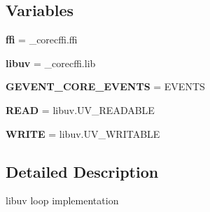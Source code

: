 \subsection*{Variables}
\begin{DoxyCompactItemize}
\item 
\mbox{\label{namespacegevent_1_1libuv_1_1loop_a4fb996f837ab3959057008e3a5cc9d41}} 
{\bfseries ffi} = \+\_\+corecffi.\+ffi
\item 
\mbox{\label{namespacegevent_1_1libuv_1_1loop_a3bfc5dc5535efe991e9957ab52cafa14}} 
{\bfseries libuv} = \+\_\+corecffi.\+lib
\item 
\mbox{\label{namespacegevent_1_1libuv_1_1loop_aa197c3458e7f59384a078b454e4ca37c}} 
{\bfseries G\+E\+V\+E\+N\+T\+\_\+\+C\+O\+R\+E\+\_\+\+E\+V\+E\+N\+TS} = E\+V\+E\+N\+TS
\item 
\mbox{\label{namespacegevent_1_1libuv_1_1loop_a43dda87d52c3ad8e4f04a18f38ffe790}} 
{\bfseries R\+E\+AD} = libuv.\+U\+V\+\_\+\+R\+E\+A\+D\+A\+B\+LE
\item 
\mbox{\label{namespacegevent_1_1libuv_1_1loop_afae1395c27b0302f4ab10b6b96c33b84}} 
{\bfseries W\+R\+I\+TE} = libuv.\+U\+V\+\_\+\+W\+R\+I\+T\+A\+B\+LE
\end{DoxyCompactItemize}


\subsection{Detailed Description}
\begin{DoxyVerb}libuv loop implementation
\end{DoxyVerb}
 